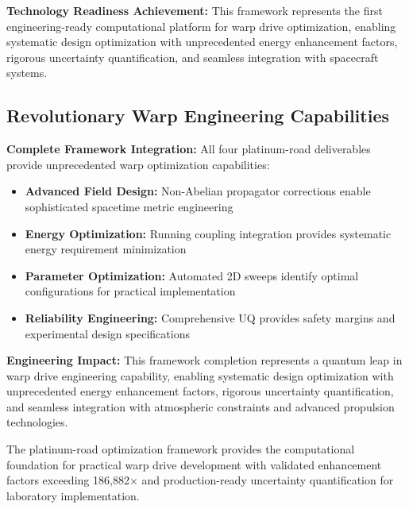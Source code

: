 \documentclass[11pt]{article}
\begin{document}
\textbf{Technology Readiness Achievement:} This framework represents the first engineering-ready computational platform for warp drive optimization, enabling systematic design optimization with unprecedented energy enhancement factors, rigorous uncertainty quantification, and seamless integration with spacecraft systems.

\subsection{Revolutionary Warp Engineering Capabilities}

\textbf{Complete Framework Integration:} All four platinum-road deliverables provide unprecedented warp optimization capabilities:

\begin{itemize}
    \item \textbf{Advanced Field Design:} Non-Abelian propagator corrections enable sophisticated spacetime metric engineering
    \item \textbf{Energy Optimization:} Running coupling integration provides systematic energy requirement minimization
    \item \textbf{Parameter Optimization:} Automated 2D sweeps identify optimal configurations for practical implementation
    \item \textbf{Reliability Engineering:} Comprehensive UQ provides safety margins and experimental design specifications
\end{itemize}

\textbf{Engineering Impact:} This framework completion represents a quantum leap in warp drive engineering capability, enabling systematic design optimization with unprecedented energy enhancement factors, rigorous uncertainty quantification, and seamless integration with atmospheric constraints and advanced propulsion technologies.

The platinum-road optimization framework provides the computational foundation for practical warp drive development with validated enhancement factors exceeding 186,882× and production-ready uncertainty quantification for laboratory implementation.
\end{document}
